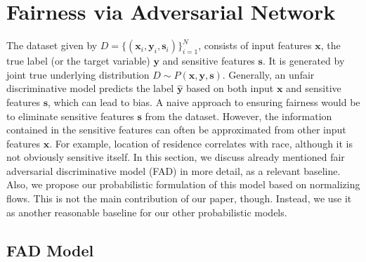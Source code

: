 \documentclass[preprint,12pt]{elsarticle}
\begin{document}
\section{Fairness via Adversarial Network}
\label{Sec:advnet}
The dataset given by $D= \{(\mathbf{x}_i, \mathbf{y}_i, \mathbf{s}_i) \}_{i=1}^N$, consists of input features $\mathbf{x}$, the true label (or the target variable) $\mathbf{y}$ and sensitive features $\mathbf{s}$. It is generated by joint true underlying distribution $D \sim P(\mathbf{x},\mathbf{y},\mathbf{s})$. Generally, an unfair discriminative model predicts the label $\mathbf{\hat{y}}$ based on both input $\mathbf{x}$ and sensitive  features $\mathbf{s}$, which can lead to bias. A naive approach to ensuring fairness would be to eliminate sensitive features $\mathbf{s}$ from the dataset. However, the information contained in the sensitive features can often be approximated from other input features $\mathbf{x}$. For example, location of residence correlates with race, although it is not obviously sensitive itself. In this section, we discuss already mentioned fair adversarial discriminative model (FAD) in more detail, as a relevant baseline.
Also, we propose our probabilistic formulation of this model based on normalizing flows. This is not the main contribution of our paper, though. Instead, we use it as another reasonable baseline for our other probabilistic models.

\subsection{FAD Model}
\end{document}

